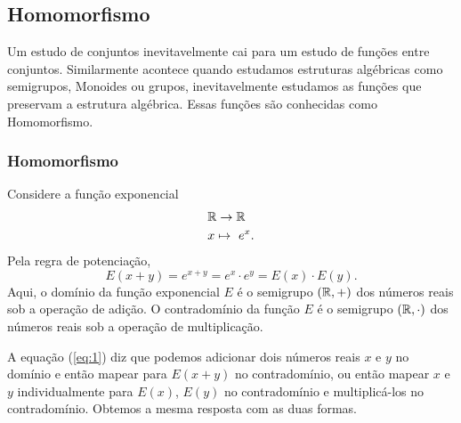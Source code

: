 \subsection{Homomorfismo}

Um estudo de conjuntos inevitavelmente cai para um estudo de funções entre conjuntos. Similarmente acontece quando estudamos estruturas algébricas como semigrupos, Monoides ou grupos, inevitavelmente estudamos as funções que preservam a estrutura algébrica. Essas funções são conhecidas como Homomorfismo.
\subsubsection{Homomorfismo}
Considere a função exponencial
\begin{alignat}{2}
  &\mathbb{R} \to \mathbb{R} \nonumber\\
  &x \mapsto\ e^{x}.
  \nonumber
\end{alignat}
Pela regra de potenciação,
\begin{equation}\label{eq:1}
  E(x+y)=e^{x+y} = e^{x}\cdot e^{y} = E(x)\cdot E(y).  
\end{equation}
Aqui, o domínio da função exponencial $E$ é o semigrupo $(\mathbb{R},+)$ dos números reais sob a operação de adição. O contradomínio da função $E$ é o semigrupo $(\mathbb{R},\cdot)$ dos números reais sob a operação de multiplicação.

A equação (\ref{eq:1}) diz que podemos adicionar dois números reais $x$ e $y$ no domínio e então mapear para $E(x+y)$ no contradomínio, ou então mapear $x$ e $y$ individualmente para $E(x)$, $E(y)$ no contradomínio e multiplicá-los no contradomínio. Obtemos a mesma resposta com as duas formas.

